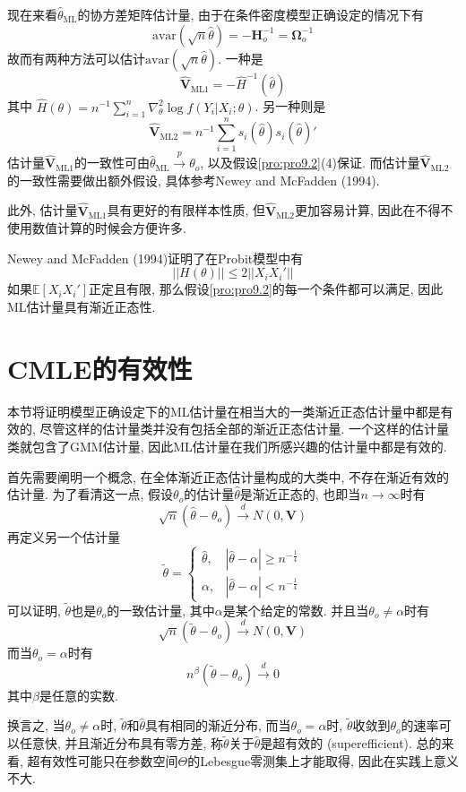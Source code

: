 \documentclass[cn, 12pt, math=mtpro2, bibstyle=apa, blue, twocol]{elegantbook}
\newcommand{\E}{\mathbb{E}}
\newcommand{\V}{\mathbold{V}}
\newcommand{\BO}{\mathbold{\Omega}}
\newcommand{\hth}{\hat{\theta}}
\begin{document}
现在来看$\hth_\text{ML}$的协方差矩阵估计量, 由于在条件密度模型正确设定的情况下有
$$\text{avar}(\sqrt{n}\hat{\theta})=-\mathbold{H}_o^{-1}=\BO_o^{-1}$$
故而有两种方法可以估计$\text{avar}(\sqrt{n}\hat{\theta})$. 一种是
$$\hat{\V} _\text{ML1}=-\hat{H}^{-1}(\hat{\theta})$$
其中
$\hat{H}(\theta)=n^{-1}\sum_{i=1}^{n}\nabla_\theta^2 \log f(Y_i|X_i;\theta)$. 另一种则是
$$\hat{\V}_\text{ML2}=n^{-1}\sum_{i=1}^{n}s_i(\hat{\theta})s_i(\hat{\theta})'$$
估计量$\hat{\V}_\text{ML1}$的一致性可由$\hat{\theta}_\text{ML}\xrightarrow{p}\theta_o$, 以及假设\ref{pro:pro9.2}(4)保证. 而估计量$\hat{\V}_\text{ML2}$的一致性需要做出额外假设, 具体参考Newey and McFadden (1994).

此外, 估计量$\hat{\V}_\text{ML1}$具有更好的有限样本性质, 但$\hat{\V}_\text{ML2}$更加容易计算, 因此在不得不使用数值计算的时候会方便许多.

Newey and McFadden (1994)证明了在Probit模型中有
$$||H(\theta)||\leq 2||X_iX_i'||$$
如果$\E[X_iX_i']$正定且有限, 那么假设\ref{pro:pro9.2}的每一个条件都可以满足, 因此ML估计量具有渐近正态性.
\section{CMLE的有效性}
本节将证明模型正确设定下的ML估计量在相当大的一类渐近正态估计量中都是有效的, 尽管这样的估计量类并没有包括全部的渐近正态估计量. 一个这样的估计量类就包含了GMM估计量, 因此ML估计量在我们所感兴趣的估计量中都是有效的.

首先需要阐明一个概念, 在全体渐近正态估计量构成的大类中, 不存在渐近有效的估计量. 为了看清这一点, 假设$\theta_o$的估计量$\hth$是渐近正态的, 也即当$n\to\infty$时有
$$\sqrt{n}(\hth-\theta_o)\xrightarrow{d} N(0,\V)$$
再定义另一个估计量
$$\tilde{\theta}=\begin{cases}
    \hth, &  |\hth-\alpha|\geq n^{-\frac{1}{4}} \\
    \alpha, & |\hth-\alpha|<n^{-\frac{1}{4}}
  \end{cases}$$
可以证明, $\tilde{\theta}$也是$\theta_o$的一致估计量, 其中$\alpha$是某个给定的常数. 并且当$\theta_o\neq \alpha$时有
$$\sqrt{n}(\tilde{\theta}-\theta_o)\xrightarrow{d} N(0,\V)$$
而当$\theta_o=\alpha$时有
$$n^\beta (\tilde{\theta}-\theta_o)\xrightarrow{d} 0$$
其中$\beta$是任意的实数.

换言之, 当$\theta_o\neq\alpha$时, $\tilde{\theta}$和$\hth$具有相同的渐近分布, 而当$\theta_o=\alpha$时, $\tilde{\theta}$收敛到$\theta_o$的速率可以任意快, 并且渐近分布具有零方差, 称$\tilde{\theta}$关于$\hth$是超有效的 (superefficient). 总的来看, 超有效性可能只在参数空间$\Theta$的Lebesgue零测集上才能取得, 因此在实践上意义不大.
\end{document}
